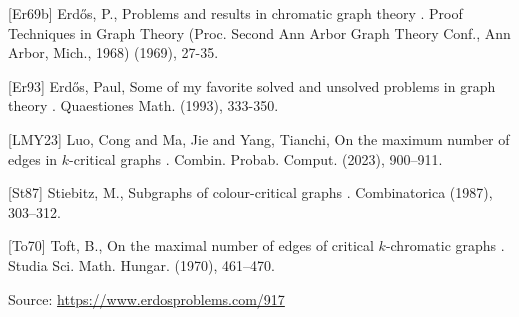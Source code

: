 \documentclass{article}
\begin{document}
[Er69b] Erd\H{o}s, P., Problems and results in chromatic graph theory . Proof Techniques in Graph Theory (Proc. Second Ann Arbor Graph Theory Conf., Ann Arbor, Mich., 1968) (1969), 27-35.

[Er93] Erd\H{o}s, Paul, Some of my favorite solved and unsolved problems in graph theory . Quaestiones Math. (1993), 333-350.

[LMY23] Luo, Cong and Ma, Jie and Yang, Tianchi, On the maximum number of edges in {$k$}-critical graphs . Combin. Probab. Comput. (2023), 900--911.

[St87] Stiebitz, M., Subgraphs of colour-critical graphs . Combinatorica (1987), 303--312.

[To70] Toft, B., On the maximal number of edges of critical {$k$}-chromatic graphs . Studia Sci. Math. Hungar. (1970), 461--470.


\bigskip
\noindent\small{Source: \url{https://www.erdosproblems.com/917}}
\end{document}
